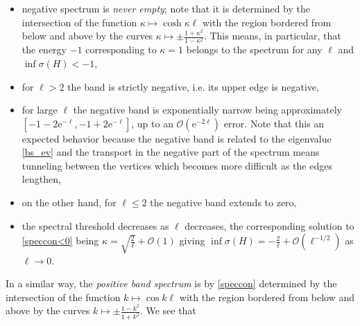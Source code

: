 \documentclass[english]{elsarticle}
\newcommand{\e}{\mathrm{e}}
\begin{document}
\begin{itemize}

\item negative spectrum is \emph{never empty}; note that it is determined by the intersection of the function $\kappa \mapsto \cosh \kappa\ell$ with the region bordered from below and above by the curves $\kappa \mapsto \pm \frac{1+\kappa^2}{1-\kappa^2}$. This means, in particular, that the energy $-1$ corresponding to $\kappa=1$ belongs to the spectrum for any $\ell$ and $\inf\sigma(H)<-1$,

\item for $\ell>2$ the band is strictly negative, i.e. its upper edge is negative,

\item for large $\ell$ the negative band is exponentially narrow being approximately $[-1-2\e^{-\ell},-1+2\e^{-\ell}]$, up to an $\mathcal{O}(\e^{-2\ell})$ error. Note that this an expected behavior because the negative band is related to the eigenvalue \eqref{bs_ev} and the transport in the negative part of the spectrum means tunneling between the vertices which becomes more difficult as the edges lengthen,

\item on the other hand, for $\ell\le 2$ the negative band extends to zero,

\item the spectral threshold decreases as $\ell$ decreases, the corresponding solution to \eqref{speccon<0} being $\kappa = \sqrt{\frac2\ell} + \mathcal{O}(1)$ giving $\inf\sigma(H) = -\frac2\ell + \mathcal{O}(\ell^{-1/2})$ as $\ell\to 0$.

\end{itemize}

\noindent In a similar way, the \emph{positive band spectrum} is by
\eqref{speccon} determined by the intersection of the function $k
\mapsto \cos k\ell$ with the region bordered from below and above by
the curves $k \mapsto \pm \frac{1-k^2}{1+k^2}$. We see that
\end{document}
